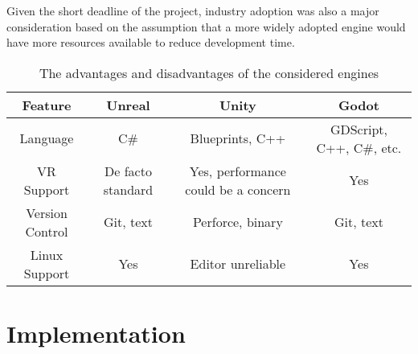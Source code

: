 \documentclass[12pt, a4paper]{report}
\begin{document}
Given the short deadline of the project, industry adoption was also a major
consideration based on the assumption that a more widely adopted engine would
have more resources available to reduce development time.

\begin{table}
\caption{The advantages and disadvantages of the considered engines}
\label{table:engine_compare}\begin{tabulary}{\textwidth}{cCCC}\toprule
Feature & Unreal & Unity & Godot \\\midrule

Language & C\# & Blueprints, C++ & GDScript, C++, C\#, etc. \\
VR Support & De facto standard & Yes, performance could be a concern & Yes \\
Version Control & Git, text & Perforce, binary & Git, text \\
Linux Support & Yes & Editor unreliable & Yes \\

\bottomrule\end{tabulary}
\end{table}

\chapter{Implementation}


\todos
\end{document}
